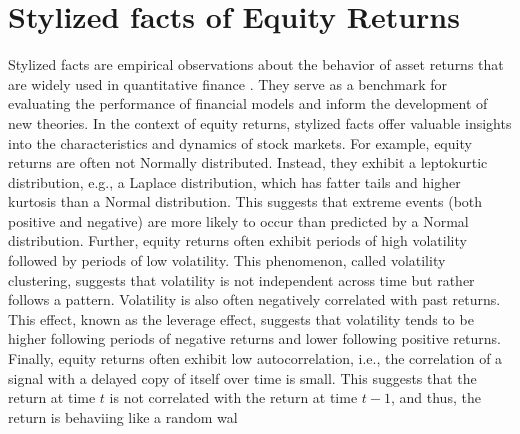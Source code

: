 \documentclass[11pt]{article}
\theoremstyle{definition}
\begin{document}
\section{Stylized facts of Equity Returns}
Stylized facts are empirical observations about the behavior of asset returns that are widely used in quantitative finance \cite{Cont-QuantFinance-2001}.
They serve as a benchmark for evaluating the performance of financial models and inform the development of new theories. 
In the context of equity returns, stylized facts offer valuable insights into the characteristics and dynamics of stock markets.
For example, equity returns are often not Normally distributed. Instead, they exhibit a leptokurtic distribution, e.g., a Laplace distribution, 
which has fatter tails and higher kurtosis than a Normal distribution. 
This suggests that extreme events (both positive and negative) are more likely to occur than predicted by a Normal distribution.
Further, equity returns often exhibit periods of high volatility followed by periods of low volatility. 
This phenomenon, called volatility clustering, suggests that volatility is not independent across time but rather follows a pattern.
Volatility is also often negatively correlated with past returns. 
This effect, known as the leverage effect, suggests that volatility tends to be higher following periods of negative returns and lower following positive returns.
Finally, equity returns often exhibit low autocorrelation, i.e., the correlation of a signal with a delayed copy of itself over time is small.
This suggests that the return at time $t$ is not correlated with the return at time $t-1$, and thus, the return is behaviing like a random wal
\end{document}
